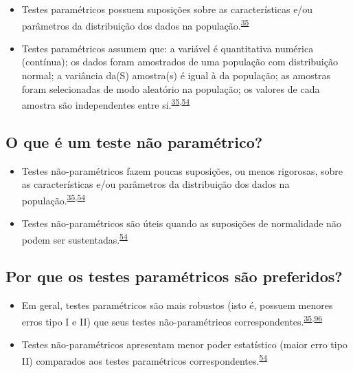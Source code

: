 \documentclass[
  a4paper,
]{book}
\begin{document}
\begin{itemize}
\item
  Testes paramétricos possuem suposições sobre as características e/ou parâmetros da distribuição dos dados na população.\textsuperscript{\protect\hyperlink{ref-vetter2017}{35}}
\item
  Testes paramétricos assumem que: a variável é quantitativa numérica (contínua); os dados foram amostrados de uma população com distribuição normal; a variância da(S) amostra(s) é igual à da população; as amostras foram selecionadas de modo aleatório na população; os valores de cada amostra são independentes entre si.\textsuperscript{\protect\hyperlink{ref-vetter2017}{35},\protect\hyperlink{ref-Ali2016}{54}}
\end{itemize}

\hypertarget{o-que-uxe9-um-teste-nuxe3o-paramuxe9trico}{%
\subsection{O que é um teste não paramétrico?}\label{o-que-uxe9-um-teste-nuxe3o-paramuxe9trico}}

\begin{itemize}
\item
  Testes não-paramétricos fazem poucas suposições, ou menos rigorosas, sobre as características e/ou parâmetros da distribuição dos dados na população.\textsuperscript{\protect\hyperlink{ref-vetter2017}{35},\protect\hyperlink{ref-Ali2016}{54}}
\item
  Testes não-paramétricos são úteis quando as suposições de normalidade não podem ser sustentadas.\textsuperscript{\protect\hyperlink{ref-Ali2016}{54}}
\end{itemize}

\hypertarget{por-que-os-testes-paramuxe9tricos-suxe3o-preferidos}{%
\subsection{Por que os testes paramétricos são preferidos?}\label{por-que-os-testes-paramuxe9tricos-suxe3o-preferidos}}

\begin{itemize}
\item
  Em geral, testes paramétricos são mais robustos (isto é, possuem menores erros tipo I e II) que seus testes não-paramétricos correspondentes.\textsuperscript{\protect\hyperlink{ref-vetter2017}{35},\protect\hyperlink{ref-greenhalgh1997}{96}}
\item
  Testes não-paramétricos apresentam menor poder estatístico (maior erro tipo II) comparados aos testes paramétricos correspondentes.\textsuperscript{\protect\hyperlink{ref-Ali2016}{54}}
\end{itemize}
\end{document}
